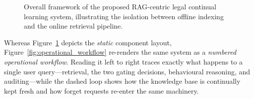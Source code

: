 \begin{figure}[H]
\caption{Overall framework of the proposed RAG-centric legal continual learning system, illustrating the isolation between offline indexing and the online retrieval pipeline.}
\label{fig:overall_architecture}
\end{figure}

Whereas Figure~\ref{fig:overall_architecture} depicts the \emph{static} component layout, Figure~\ref{fig:operational_workflow} re-renders the same system as a \emph{numbered operational workflow}. Reading it left to right traces exactly what happens to a single user query---retrieval, the two gating decisions, behavioural reasoning, and auditing---while the dashed loop shows how the knowledge base is continually kept fresh and how forget requests re-enter the same machinery.

